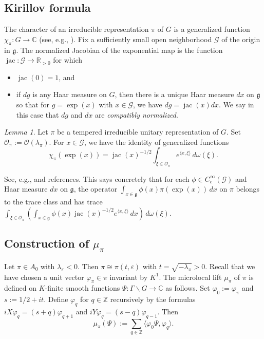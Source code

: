 \documentclass[reqno,10pt]{amsart}
\theoremstyle{plain} %
\theoremstyle{definition}
\theoremstyle{plain} %
\theoremstyle{remark}
\theoremstyle{itplain} %
\newtheorem*{lemma*}{Lemma}
\theoremstyle{remark} %
\numberwithin{equation}{section}
\def\eps{\varepsilon}
\DeclareMathOperator{\jac}{jac}
\begin{document}
\subsection{Kirillov formula}\label{sec:kirillov-formula}
The character of an irreducible representation $\pi$ of $G$ is a generalized function $\chi_\pi : G \rightarrow \mathbb{C}$ (see, e.g., \cite[\S X]{MR855239}).  Fix a sufficiently small open neighborhood $\mathcal{G}$ of the origin in $\mathfrak{g}$.  The normalized Jacobian of the exponential map is the function $\jac : \mathcal{G} \rightarrow \mathbb{R}_{>0}$ for which
\begin{itemize}
\item $\jac(0) = 1$, and
\item if $d g$ is any Haar measure on $G$, then there is a unique Haar measure $d x$ on $\mathfrak{g}$ so that for $g = \exp(x)$ with $x \in \mathcal{G}$, we have $d g = \jac(x) d x$.  We say in this case that $d g$ and $d x$ are \emph{compatibly normalized}.
\end{itemize}
\begin{lemma*}
  Let $\pi$ be a tempered irreducible unitary representation of $G$.  Set $\mathcal{O}_\pi := \mathcal{O}(\lambda_\pi)$.  For $x \in \mathcal{G}$, we have the identity of generalized functions
  \[
    \chi_\pi(\exp(x)) = \jac(x)^{-1/2} \int_{\xi \in \mathcal{O}_\pi} e^{\langle x, \xi \rangle} \, d \omega (\xi ).
  \]
\end{lemma*}
See, e.g., \cite[\S6]{nelson-venkatesh-1} and references.  This says concretely that for each $\phi \in C_c^\infty(\mathcal{G})$ and Haar measure $d x$ on $\mathfrak{g}$, the operator $\int_{x \in \mathfrak{g}} \phi(x) \pi(\exp(x)) \, d x$ on $\pi$ belongs to the trace class and has trace $\int_{\xi \in \mathcal{O}_\pi} (\int_{x \in \mathfrak{g}} \phi(x) \jac(x)^{-1/2} e^{\langle x, \xi \rangle} \, d x) \, d \omega (\xi )$.


\subsection{Construction of $\mu_\pi$}\label{sec:constr-mu-pi-ZW}
Let $\pi \in A_0$ with $\lambda_\pi < 0$.  Then $\pi \cong \pi(t,\eps)$ with $t = \sqrt{-\lambda_\pi} > 0$.  Recall that we have chosen a unit vector $\varphi_\pi \in \pi$ invariant by $K^1$.  The microlocal lift $\mu_\pi$ of $\pi$ is defined on $K$-finite smooth functions $\Psi : \Gamma \backslash G \rightarrow \mathbb{C}$ as follows.  Set $\varphi_0 := \varphi_\pi$ and $s := 1/2 + i t$.  Define $\varphi_q$ for $q \in \mathbb{Z}$ recursively by the formulas $i X \varphi_q = (s + q) \varphi_{q+1}$ and $i Y \varphi_q = (s - q) \varphi_{q-1}$.  Then
\[
  \mu_\pi(\Psi) := \sum_{q \in \mathbb{Z}} \langle \varphi_0 \Psi, \varphi_q \rangle.
\]
\end{document}
